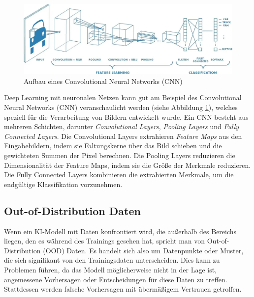 \begin{figure}[b]
	\centering
	\includegraphics[width=14cm]{figure_cnn.png} %
	\caption{Aufbau eines Convolutional Neural Networks (CNN)}
	\label{fig:cnn}
\end{figure}

Deep Learning mit neuronalen Netzen kann gut am Beispiel des Convolutional Neural Networks (CNN) veranschaulicht werden (siehe Abbildung \ref{fig:cnn}), welches speziell für die Verarbeitung von Bildern entwickelt wurde. Ein CNN besteht aus mehreren Schichten, darunter \textit{Convolutional Layers}, \textit{Pooling Layers} und \textit{Fully Connected Layers}. Die Convolutional Layers extrahieren \textit{Feature Maps} aus den Eingabebildern, indem sie Faltungskerne über das Bild schieben und die gewichteten Summen der Pixel berechnen. Die Pooling Layers reduzieren die Dimensionalität der Feature Maps, indem sie die Größe der Merkmale reduzieren. Die Fully Connected Layers kombinieren die extrahierten Merkmale, um die endgültige Klassifikation vorzunehmen.


\subsection{Out-of-Distribution Daten} \label{sec:ood}

Wenn ein KI-Modell mit Daten konfrontiert wird, die außerhalb des Bereichs liegen, den es während des Trainings gesehen hat, spricht man von Out-of-Distribution (OOD) Daten. Es handelt sich also um Datenpunkte oder Muster, die sich signifikant von den Trainingsdaten unterscheiden. Dies kann zu Problemen führen, da das Modell möglicherweise nicht in der Lage ist, angemessene Vorhersagen oder Entscheidungen für diese Daten zu treffen. Stattdessen werden falsche Vorhersagen mit übermäßigem Vertrauen getroffen.

